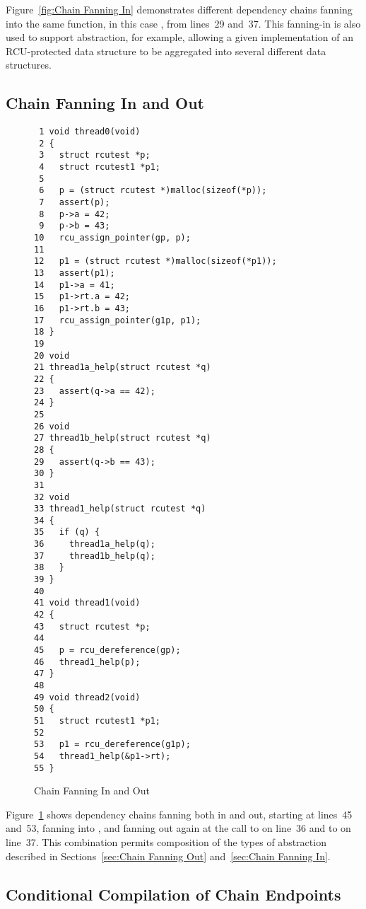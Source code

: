 \documentclass[letterpaper,twocolumn,10pt]{article}
\begin{document}
Figure~\ref{fig:Chain Fanning In}
demonstrates different dependency chains fanning into the same function,
in this case , from lines~29 and~37.
This fanning-in is also used to support abstraction, for example,
allowing a given implementation of an RCU-protected data structure
to be aggregated into several different data structures.

\subsection{Chain Fanning In and Out}
\label{sec:Chain Fanning In and Out}

\begin{figure}[tbp]
{ \scriptsize
\begin{verbatim}
 1 void thread0(void)
 2 {
 3   struct rcutest *p;
 4   struct rcutest1 *p1;
 5
 6   p = (struct rcutest *)malloc(sizeof(*p));
 7   assert(p);
 8   p->a = 42;
 9   p->b = 43;
10   rcu_assign_pointer(gp, p);
11
12   p1 = (struct rcutest *)malloc(sizeof(*p1));
13   assert(p1);
14   p1->a = 41;
15   p1->rt.a = 42;
16   p1->rt.b = 43;
17   rcu_assign_pointer(g1p, p1);
18 }
19
20 void
21 thread1a_help(struct rcutest *q)
22 {
23   assert(q->a == 42);
24 }
25
26 void
27 thread1b_help(struct rcutest *q)
28 {
29   assert(q->b == 43);
30 }
31
32 void
33 thread1_help(struct rcutest *q)
34 {
35   if (q) {
36     thread1a_help(q);
37     thread1b_help(q);
38   }
39 }
40
41 void thread1(void)
42 {
43   struct rcutest *p;
44
45   p = rcu_dereference(gp);
46   thread1_help(p);
47 }
48
49 void thread2(void)
50 {
51   struct rcutest1 *p1;
52
53   p1 = rcu_dereference(g1p);
54   thread1_help(&p1->rt);
55 }
\end{verbatim}
}
\caption{Chain Fanning In and Out}
\label{fig:Chain Fanning In and Out}
\end{figure}

Figure~\ref{fig:Chain Fanning In and Out}
shows dependency chains fanning both in and out, starting
at lines~45 and~53, fanning into , and
fanning out again at the call to  on
line~36 and to  on line~37.
This combination permits composition of the types of abstraction
described in
Sections~\ref{sec:Chain Fanning Out}
and~\ref{sec:Chain Fanning In}.

\subsection{Conditional Compilation of Chain Endpoints}
\label{sec:Conditional Compilation of Chain Endpoints}
\end{document}
